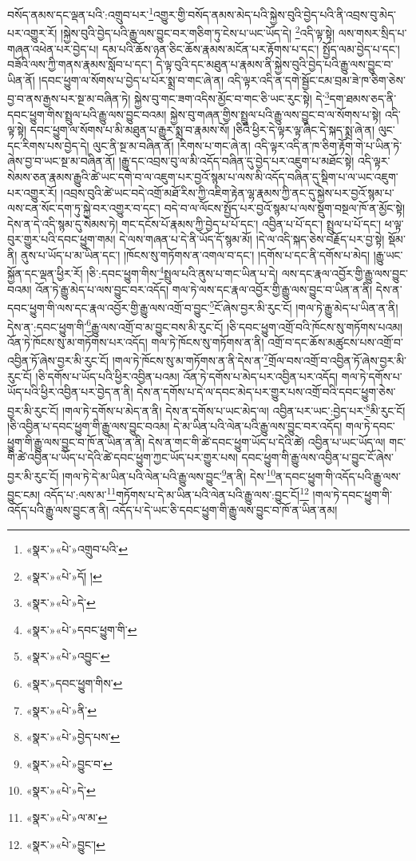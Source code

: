 བསོད་ནམས་དང་ལྡན་པའི་:འགྲུབ་པར་\footnote{«སྣར་»«པེ་»འགྲུབ་པའི་}འགྱུར་གྱི་བསོད་ནམས་མེད་པའི་སྐྱེས་བུའི་བྱེད་པའི་ནི་འབྲས་བུ་མེད་པར་འགྱུར་རོ། །སྐྱེས་བུའི་བྱེད་པའི་རྒྱུ་ལས་བྱུང་བར་གཅིག་ཏུ་ངེས་པ་ཡང་ཡོད་དེ། \footnote{«སྣར་»«པེ་»དོ། ། }འདི་ལྟ་སྟེ། ལས་གསར་སྲིད་པ་གཞན་འཕེན་པར་བྱེད་པ། དམ་པའི་ཆོས་ཉན་ཅིང་ཆོས་རྣམས་མངོན་པར་རྟོགས་པ་དང་། སྤྱོད་ལམ་བྱེད་པ་དང་། བཟོའི་ལས་ཀྱི་གནས་རྣམས་སློབ་པ་དང་། དེ་ལྟ་བུའི་དང་མཐུན་པ་རྣམས་ནི་སྐྱེས་བུའི་བྱེད་པའི་རྒྱུ་ལས་བྱུང་བ་ཡིན་ནོ། །དབང་ཕྱུག་ལ་སོགས་པ་བྱེད་པ་པོར་སྨྲ་བ་གང་ཞེ་ན། འདི་ལྟར་འདི་ན་དགེ་སྦྱོང་ངམ་བྲམ་ཟེ་ཁ་ཅིག་ཅེས་བྱ་བ་ནས་རྒྱས་པར་སྔ་མ་བཞིན་ཏེ། སྐྱེས་བུ་གང་ཟག་འདིས་མྱོང་བ་གང་ཅི་ཡང་རུང་སྟེ། དེ་\footnote{«སྣར་»«པེ་»དེ་}དག་ཐམས་ཅད་ནི་དབང་ཕྱུག་གིས་སྤྲུལ་པའི་རྒྱུ་ལས་བྱུང་བའམ། སྐྱེས་བུ་གཞན་གྱིས་སྤྲུལ་པའི་རྒྱུ་ལས་བྱུང་བ་ལ་སོགས་པ་སྟེ། འདི་ལྟ་སྟེ། དབང་ཕྱུག་ལ་སོགས་པ་མི་མཐུན་པ་རྒྱུར་སྨྲ་བ་རྣམས་སོ། །ཅིའི་ཕྱིར་དེ་ལྟར་ལྟ་ཞིང་དེ་སྐད་སྨྲ་ཞེ་ན། ལུང་དང་རིགས་པས་བྱེད་དེ། ལུང་ནི་སྔ་མ་བཞིན་ནོ། །རིགས་པ་གང་ཞེ་ན། འདི་ལྟར་འདི་ན་ཁ་ཅིག་རྟོག་གེ་པ་ཡིན་ཏེ་ཞེས་བྱ་བ་ཡང་སྔ་མ་བཞིན་ནོ། །རྒྱུ་དང་འབྲས་བུ་ལ་མི་འདོད་བཞིན་དུ་བྱེད་པར་འཇུག་པ་མཐོང་སྟེ། འདི་ལྟར་སེམས་ཅན་རྣམས་རྒྱུའི་ཚེ་ཡང་དགེ་བ་ལ་འཇུག་པར་བྱའོ་སྙམ་པ་ལས་མི་འདོད་བཞིན་དུ་སྡིག་པ་ལ་ཡང་འཇུག་པར་འགྱུར་རོ། །འབྲས་བུའི་ཚེ་ཡང་བདེ་འགྲོ་མཐོ་རིས་ཀྱི་འཇིག་རྟེན་ལྷ་རྣམས་ཀྱི་ནང་དུ་སྐྱེས་པར་བྱའོ་སྙམ་པ་ལས་ངན་སོང་དག་ཏུ་སྐྱེ་བར་འགྱུར་བ་དང་། བདེ་བ་ལ་ལོངས་སྤྱོད་པར་བྱའོ་སྙམ་པ་ལས་སྡུག་བསྔལ་ཁོ་ན་མྱོང་སྟེ། དེས་ན་དེ་འདི་སྙམ་དུ་སེམས་ཏེ། གང་དངོས་པོ་རྣམས་ཀྱི་བྱེད་པ་པོ་དང་། འབྱིན་པ་པོ་དང་། སྤྲུལ་པ་པོ་དང་། ཕ་ལྟ་བུར་གྱུར་པའི་དབང་ཕྱུག་གམ། དེ་ལས་གཞན་པ་དེ་ནི་ཡོད་དོ་སྙམ་མོ། །དེ་ལ་འདི་སྐད་ཅེས་བརྗོད་པར་བྱ་སྟེ། སྡོམ་ནི། ནུས་པ་ཡོད་པ་མ་ཡིན་དང་། །ཁོངས་སུ་གཏོགས་ན་འགལ་བ་དང་། །དགོས་པ་དང་ནི་དགོས་པ་མེད། །རྒྱུ་ཡང་སྐྱོན་དང་ལྡན་ཕྱིར་རོ། །ཅི་:དབང་ཕྱུག་གིས་\footnote{«སྣར་»«པེ་»དབང་ཕྱུག་གི་}སྤྲུལ་པའི་ནུས་པ་གང་ཡིན་པ་དེ། ལས་དང་རྣལ་འབྱོར་གྱི་རྒྱུ་ལས་བྱུང་བའམ། འོན་ཏེ་རྒྱུ་མེད་པ་ལས་བྱུང་བར་འདོད། གལ་ཏེ་ལས་དང་རྣལ་འབྱོར་གྱི་རྒྱུ་ལས་བྱུང་བ་ཡིན་ན་ནི། དེས་ན་དབང་ཕྱུག་གི་ལས་དང་རྣལ་འབྱོར་གྱི་རྒྱུ་ལས་འགྲོ་བ་བྱུང་\footnote{«སྣར་»«པེ་»འབྱུང་}ངོ་ཞེས་བྱར་མི་རུང་ངོ། །གལ་ཏེ་རྒྱུ་མེད་པ་ཡིན་ན་ནི། དེས་ན་:དབང་ཕྱུག་གི་\footnote{«སྣར་»དབང་ཕྱུག་གིས་}རྒྱུ་ལས་འགྲོ་བ་མ་བྱུང་བས་མི་རུང་ངོ། །ཅི་དབང་ཕྱུག་འགྲོ་བའི་ཁོངས་སུ་གཏོགས་པའམ། འོན་ཏེ་ཁོངས་སུ་མ་གཏོགས་པར་འདོད། གལ་ཏེ་ཁོངས་སུ་གཏོགས་ན་ནི། འགྲོ་བ་དང་ཆོས་མཚུངས་པས་འགྲོ་བ་འབྱིན་ཏོ་ཞེས་བྱར་མི་རུང་ངོ། །གལ་ཏེ་ཁོངས་སུ་མ་གཏོགས་ན་ནི་དེས་ན་\footnote{«སྣར་»«པེ་»ནི་}གྲོལ་བས་འགྲོ་བ་འབྱིན་ཏོ་ཞེས་བྱར་མི་རུང་ངོ། །ཅི་དགོས་པ་ཡོད་པའི་ཕྱིར་འབྱིན་པའམ། འོན་ཏེ་དགོས་པ་མེད་པར་འབྱིན་པར་འདོད། གལ་ཏེ་དགོས་པ་ཡོད་པའི་ཕྱིར་འབྱིན་པར་བྱེད་ན་ནི། དེས་ན་དགོས་པ་དེ་ལ་དབང་མེད་པར་གྱུར་པས་འགྲོ་བའི་དབང་ཕྱུག་ཅེས་བྱར་མི་རུང་ངོ། །གལ་ཏེ་དགོས་པ་མེད་ན་ནི། དེས་ན་དགོས་པ་ཡང་མེད་ལ། འབྱིན་པར་ཡང་:བྱེད་པར་\footnote{«སྣར་»«པེ་»བྱེད་པས་}མི་རུང་ངོ། །ཅི་འབྱིན་པ་དབང་ཕྱུག་གི་རྒྱུ་ལས་བྱུང་བའམ། དེ་མ་ཡིན་པའི་ལེན་པའི་རྒྱུ་ལས་བྱུང་བར་འདོད། གལ་ཏེ་དབང་ཕྱུག་གི་རྒྱུ་ལས་བྱུང་བ་ཁོ་ན་ཡིན་ན་ནི། དེས་ན་གང་གི་ཚེ་དབང་ཕྱུག་ཡོད་པ་དེའི་ཚེ། འབྱིན་པ་ཡང་ཡོད་ལ། གང་གི་ཚེ་འབྱིན་པ་ཡོད་པ་དེའི་ཚེ་དབང་ཕྱུག་ཀྱང་ཡོད་པར་གྱུར་པས། དབང་ཕྱུག་གི་རྒྱུ་ལས་འབྱིན་པ་བྱུང་ངོ་ཞེས་བྱར་མི་རུང་ངོ། །གལ་ཏེ་དེ་མ་ཡིན་པའི་ལེན་པའི་རྒྱུ་ལས་བྱུང་\footnote{«སྣར་»«པེ་»བྱུང་བ་}ན་ནི། དེས་\footnote{«སྣར་»«པེ་»དེ་}ན་དབང་ཕྱུག་གི་འདོད་པའི་རྒྱུ་ལས་བྱུང་ངམ། འདོད་པ་:ལས་མ་\footnote{«སྣར་»«པེ་»ལ་མ་}གཏོགས་པ་དེ་མ་ཡིན་པའི་ལེན་པའི་རྒྱུ་ལས་:བྱུང་ངོ།\footnote{«སྣར་»«པེ་»བྱུང་།} །གལ་ཏེ་དབང་ཕྱུག་གི་འདོད་པའི་རྒྱུ་ལས་བྱུང་ན་ནི། འདོད་པ་དེ་ཡང་ཅི་དབང་ཕྱུག་གི་རྒྱུ་ལས་བྱུང་བ་ཁོ་ན་ཡིན་ནམ། 
